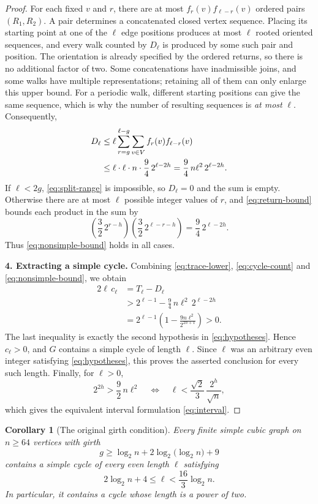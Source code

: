 \documentclass[11pt,a4paper]{article}
\newtheorem{corollary}[theorem]{Corollary}
\begin{document}
\begin{proof}
For each fixed $v$ and $r$, there are at most
$f_r(v)f_{\ell-r}(v)$ ordered pairs $(R_1,R_2)$.
A pair determines a concatenated closed vertex sequence.
Placing its starting point at one of the $\ell$ edge positions
produces at most $\ell$ rooted oriented sequences, and every walk
counted by $D_\ell$ is produced by some such pair and position.
The orientation is already specified by the ordered returns, so
there is no additional factor of two. Some concatenations have
inadmissible joins, and some walks have multiple representations;
retaining all of them can only enlarge this upper bound. For a
periodic walk, different starting positions can give the same
sequence, which is why the number of resulting sequences is
\emph{at most} $\ell$.
Consequently,
\begin{align}
  D_\ell
  &\le\ell\sum_{r=g}^{\ell-g}\sum_{v\in V}
       f_r(v)f_{\ell-r}(v)\notag\\
  &\le\ell\cdot\ell\cdot n\cdot\frac94\,2^{\ell-2h}
   =\frac94\,n\ell^2\,2^{\ell-2h}.
  \label{eq:nonsimple-bound}
\end{align}
If $\ell<2g$, \eqref{eq:split-range} is impossible, so $D_\ell=0$
and the sum is empty. Otherwise there are at most $\ell$ possible
integer values of $r$, and \eqref{eq:return-bound} bounds each
product in the sum by
\[
  \left(\frac32\,2^{r-h}\right)
  \left(\frac32\,2^{\ell-r-h}\right)
  =\frac94\,2^{\ell-2h}.
\]
Thus \eqref{eq:nonsimple-bound} holds in all cases.

\medskip
\noindent\textbf{4. Extracting a simple cycle.}
Combining \eqref{eq:trace-lower}, \eqref{eq:cycle-count} and
\eqref{eq:nonsimple-bound}, we obtain
\begin{align*}
  2\ell\,c_\ell
  &=T_\ell-D_\ell\\
  &>2^{\ell-1}-\frac94\,n\ell^2\,2^{\ell-2h}\\
  &=2^{\ell-1}\left(1-\frac{9n\ell^2}{2^{2h+1}}\right)
  >0.
\end{align*}
The last inequality is exactly the second hypothesis in
\eqref{eq:hypotheses}. Hence $c_\ell>0$, and $G$ contains a simple
cycle of length $\ell$.
Since $\ell$ was an arbitrary even integer satisfying
\eqref{eq:hypotheses}, this proves the asserted conclusion for every
such length. Finally, for $\ell>0$,
\[
  2^{2h}>\frac92\,n\ell^2
  \quad\Longleftrightarrow\quad
  \ell<\frac{\sqrt2}{3}\,\frac{2^h}{\sqrt n},
\]
which gives the equivalent interval formulation \eqref{eq:interval}.
\end{proof}

\bigskip
\begin{corollary}[The original girth condition]\label{cor:power-two}
Every finite simple cubic graph on $n\ge64$ vertices with girth
\[
  g\ge\log_2 n+2\log_2\!\bigl(\log_2 n\bigr)+9
\]
contains a simple cycle of every even length $\ell$ satisfying
\begin{equation}\label{eq:cor-interval}
  2\log_2 n+4\le\ell<\frac{16}{3}\log_2 n.
\end{equation}
In particular, it contains a cycle whose length is a power of two.
\end{corollary}
\end{document}
